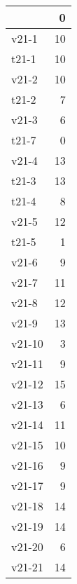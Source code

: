 \begin{tabular}{lr}
\toprule
{} &   0 \\
\midrule
v21-1  &  10 \\
t21-1  &  10 \\
v21-2  &  10 \\
t21-2  &   7 \\
v21-3  &   6 \\
t21-7  &   0 \\
v21-4  &  13 \\
t21-3  &  13 \\
t21-4  &   8 \\
v21-5  &  12 \\
t21-5  &   1 \\
v21-6  &   9 \\
v21-7  &  11 \\
v21-8  &  12 \\
v21-9  &  13 \\
v21-10 &   3 \\
v21-11 &   9 \\
v21-12 &  15 \\
v21-13 &   6 \\
v21-14 &  11 \\
v21-15 &  10 \\
v21-16 &   9 \\
v21-17 &   9 \\
v21-18 &  14 \\
v21-19 &  14 \\
v21-20 &   6 \\
v21-21 &  14 \\
\bottomrule
\end{tabular}
